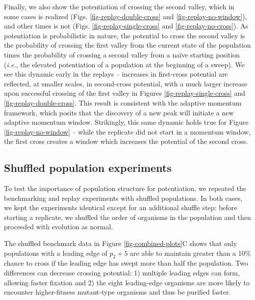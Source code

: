 Finally, we also show the potentiation of crossing the second valley, which in some cases is realized (Figs. \ref{fig-replay-double-cross} and \ref{fig-replay-no-window}), and other times is not (Figs. \ref{fig-replay-single-cross} and \ref{fig-replay-no-cross}).
As potentiation is probabilistic in nature, the potential to cross the second valley is the probability of crossing the first valley from the current state of the population times the probability of crossing a second valley from a na\"ive starting position (\textit{i.e.}, the elevated potentiation of a population at the beginning of a sweep). 
We see this dynamic early in the replays -- increases in first-cross potential are reflected, at smaller scales, in second-cross potential,
with a much larger increase upon successful crossing of the first valley in Figures \ref{fig-replay-single-cross} and \ref{fig-replay-double-cross}. %
This result is consistent with the adaptive momentum framework, which posits that the discovery of a new peak will initiate a new adaptive momentum window. 
Strikingly, this same dynamic holds true for Figure \ref{fig-replay-no-window} -- while the replicate did not start in a momentum window, the first cross creates a window which increases the potential of the second cross.

\subsection{Shuffled population experiments}

To test the importance of population structure for potentiation, we repeated the benchmarking and replay experiments with shuffled populations. 
In both cases, we kept the experiments identical except for an additional shuffle step: before starting a replicate, we shuffled the order of organisms in the population and then proceeded with evolution as normal. 

The shuffled benchmark data in Figure \ref{fig-combined-plots}C shows that only populations with a leading edge of $p_{2} + 5$ are able to maintain greater than a 10\% chance to cross if the leading edge has swept more than half the population.
Two differences can decrease crossing potential: 
1) multiple leading edges can form, allowing faster fixation and 
2) the eight leading-edge organisms are more likely to encounter higher-fitness mutant-type organisms and thus be purified faster.

